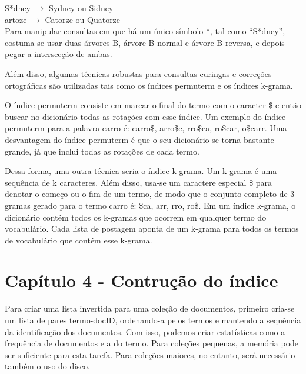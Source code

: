 \indent S*dney $\rightarrow$ Sydney ou Sidney \\
\indent *artoze $\rightarrow$ Catorze ou Quatorze \\

  Para manipular consultas em que há um único símbolo *, tal como “S*dney”, costuma-se usar duas árvores-B, árvore-B normal e árvore-B reversa, e depois pegar a intersecção de ambas.    

  Além disso, algumas técnicas robustas para consultas curingas e correções ortográficas são utilizadas tais como os índices permuterm e os índices k-grama. 
    
  O índice permuterm consiste em marcar o final do termo com o caracter \$ e então buscar no dicionário todas as rotações com esse índice. Um exemplo do índice permuterm para a palavra carro é:  carro\$, arro\$c, rro\$ca, ro\$car, o\$carr. Uma desvantagem do índice permuterm é que o seu dicionário se torna bastante grande, já que inclui todas as rotações de cada termo. 
    
  Dessa forma, uma outra técnica seria o índice k-grama. Um k-grama é uma sequência de k caracteres. Além disso, usa-se um caractere especial \$ para denotar o começo ou o fim de um termo, de modo que o conjunto completo de 3-gramas gerado para o termo carro é: \$ca, arr, rro, ro\$. Em um índice k-grama, o dicionário contém todos os k-gramas que ocorrem em qualquer termo do  vocabulário. Cada lista de postagem aponta de um k-grama para todos os termos de vocabulário que contém esse k-grama.

\section{Capítulo 4 - Contrução do índice}
\label{sec:construcao_indice}

Para criar uma lista invertida para uma coleção de documentos, primeiro cria-se um lista de pares termo-docID, ordenando-a pelos termos e mantendo a sequência da identificação dos documentos. Com isso, podemos criar estatísticas como a frequência de documentos e a do termo. Para coleções pequenas, a memória pode ser suficiente para esta tarefa. Para coleções maiores, no entanto, será necessário também o uso do disco.


